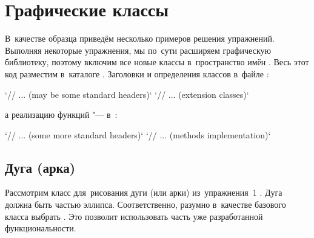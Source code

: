 
\chapter{Графические классы}
В~качестве образца приведём несколько примеров решения упражнений. Выполняя некоторые упражнения, мы по~сути расширяем графическую библиотеку, поэтому включим все новые классы в~пространство имён . Весь этот код разместим в~каталоге . Заголовки и определения классов в~файле :

\cpp`// ... (may be some standard headers)`
\cpp`// ... (extension classes)`

\noindent а реализацию функций "--- в~:

\cpp`// ... (some more standard headers)`
\cpp`// ... (methods implementation)`



\section{Дуга (арка)}
Рассмотрим класс  для~рисования дуги (или арки) из~упражнения~1 . Дуга должна быть частью эллипса. Соответственно, разумно в~качестве базового класса выбрать . Это позволит использовать часть уже разработанной функциональности.

